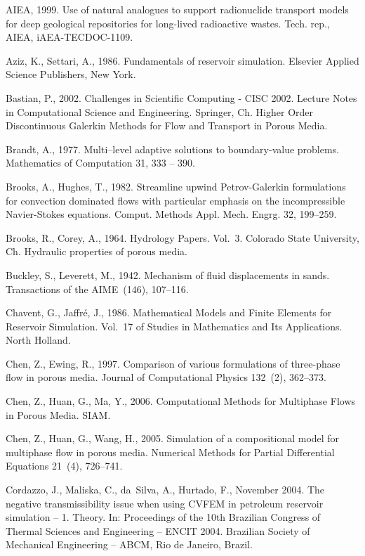 \documentclass[times]{fldauth}
\begin{document}
\begin{thebibliography}{9}
%

AIEA, 1999. Use of natural analogues to support radionuclide transport models
  for deep geological repositories for long-lived radioactive wastes. Tech.
  rep., AIEA, iAEA-TECDOC-1109.

Aziz, K., Settari, A., 1986. Fundamentals of reservoir simulation. Elsevier
  Applied Science Publishers, New York.

Bastian, P., 2002. Challenges in Scientific Computing - CISC 2002. Lecture
  Notes in Computational Science and Engineering. Springer, Ch. Higher Order
  Discontinuous Galerkin Methods for Flow and Transport in Porous Media.

Brandt, A., 1977. Multi–level adaptive solutions to boundary-value problems.
  Mathematics of Computation 31, 333 -- 390.

Brooks, A., Hughes, T., 1982. Streamline upwind {P}etrov-{G}alerkin
  formulations for convection dominated flows with particular emphasis on the
  incompressible {N}avier-{S}tokes equations. Comput. Methods Appl. Mech.
  Engrg. 32, 199--259.

Brooks, R., Corey, A., 1964. Hydrology Papers. Vol.~3. Colorado State
  University, Ch. Hydraulic properties of porous media.

Buckley, S., Leverett, M., 1942. Mechanism of fluid displacements in sands.
  Transactions of the AIME~(146), 107--116.

Chavent, G., Jaffr\'e, J., 1986. Mathematical Models and Finite Elements for
  Reservoir Simulation. Vol.~17 of Studies in Mathematics and Its Applications.
  North Holland.

Chen, Z., Ewing, R., 1997. Comparison of various formulations of three-phase
  flow in porous media. Journal of Computational Physics 132~(2), 362--373.

Chen, Z., Huan, G., Ma, Y., 2006. Computational Methods for Multiphase Flows in
  Porous Media. SIAM.

Chen, Z., Huan, G., Wang, H., 2005. Simulation of a compositional model for
  multiphase flow in porous media. Numerical Methods for Partial Differential
  Equations 21~(4), 726--741.

Cordazzo, J., Maliska, C., da~Silva, A., Hurtado, F., November 2004. The
  negative transmissibility issue when using {CVFEM} in petroleum reservoir
  simulation -- 1. {T}heory. In: Proceedings of the 10th Brazilian Congress of
  Thermal Sciences and Engineering -- ENCIT 2004. Brazilian Society of
  Mechanical Engineering -- ABCM, Rio de Janeiro, Brazil.


\end{thebibliography}
\end{document}
